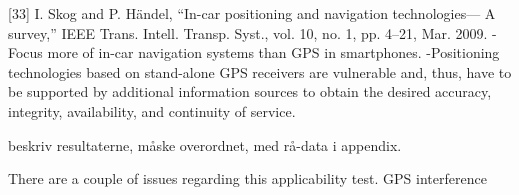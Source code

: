 [33] I. Skog and P. Händel, “In-car positioning and navigation technologies— A survey,” IEEE Trans. Intell. Transp. Syst., vol. 10, no. 1, pp. 4–21, Mar. 2009.
-Focus more of in-car navigation systems than GPS in smartphones.
-Positioning technologies based on stand-alone GPS receivers are vulnerable and, thus, have to be supported by additional information sources to obtain the desired accuracy, integrity, availability, and continuity of service.

beskriv resultaterne, måske overordnet, med rå-data i appendix.

There are a couple of issues regarding this applicability test. 
GPS interference
